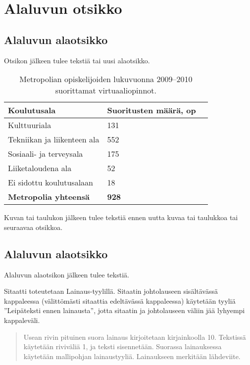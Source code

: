 \section{Alaluvun otsikko}

\subsection{Alaluvun alaotsikko}

Otsikon jälkeen tulee tekstiä tai uusi alaotsikko.

\begin{table}[h]
  \caption{Metropolian opiskelijoiden lukuvuonna 2009–2010 suorittamat virtuaaliopinnot.}
  \begin{tabular}{| l | l | l |}
  \hline
  \bfseries Koulutusala & \bfseries Suoritusten määrä, op \\
  \hline
  Kulttuuriala & 131 \\
  \hline
  Tekniikan ja liikenteen ala & 552 \\
  \hline
  Sosiaali- ja terveysala & 175 \\
  \hline
  Liiketaloudena ala & 52 \\
  \hline
  Ei sidottu koulutusalaan & 18 \\
  \hline
  \bfseries Metropolia yhteensä & \bfseries 928 \\
  \hline
  \end{tabular}
  \label{tab:virtual studies}
\end{table}

Kuvan tai taulukon jälkeen tulee tekstiä ennen uutta kuvaa tai taulukkoa tai seuraavaa otsikkoa.

\subsection{Alaluvun alaotsikko}

Alaluvun alaotsikon jälkeen tulee tekstiä.

Sitaatti toteutetaan Lainaus-tyylillä. Sitaatin johtolauseen sisältävässä kappaleessa (välittömästi sitaattia edeltävässä kappaleessa) käytetään tyyliä ”Leipäteksti ennen lainausta”, jotta sitaatin ja johtolauseen väliin jää lyhyempi kappaleväli.

\begin{quote}
Usean rivin pituinen suora lainaus kirjoitetaan kirjainkoolla 10. Tekstissä käytetään riviväliä 1, ja teksti sisennetään. Suorassa lainauksessa käytetään mallipohjan lainaustyyliä. Lainaukseen merkitään lähdeviite.
\end{quote}

